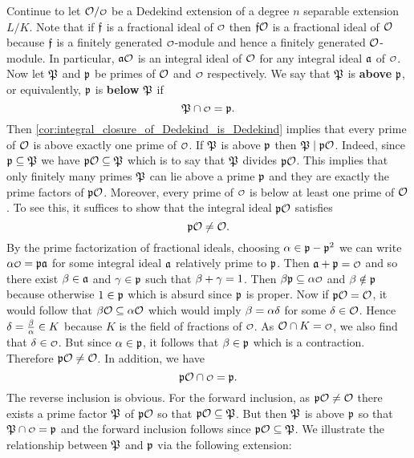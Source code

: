     Continue to let $\mc{O}/\smc{O}$ be a Dedekind extension of a degree $n$ separable extension $L/K$. Note that if $\mathfrak{f}$ is a fractional ideal of $\smc{O}$ then $\mathfrak{f}\mathcal{O}$ is a fractional ideal of $\mathcal{O}$ because $\mathfrak{f}$ is a finitely generated $\smc{O}$-module and hence a finitely generated $\mathcal{O}$-module. In particular, $\mathfrak{a}\mathcal{O}$ is an integral ideal of $\mathcal{O}$ for any integral ideal $\mathfrak{a}$ of $\smc{O}$. Now let $\mathfrak{P}$ and $\mathfrak{p}$ be primes of $\mathcal{O}$ and $\smc{O}$ respectively. We say that $\mathfrak{P}$ is \textbf{above} $\mathfrak{p}$, or equivalently, $\mathfrak{p}$ is \textbf{below} $\mathfrak{P}$ if
    \[
      \mf{P} \cap \smc{O} = \mf{p}.
    \]
    Then \cref{cor:integral_closure_of_Dedekind_is_Dedekind} implies that every prime of $\mathcal{O}$ is above exactly one prime of $\smc{O}$. If $\mathfrak{P}$ is above $\mathfrak{p}$ then $\mathfrak{P} \mid \mathfrak{p}\mathcal{O}$. Indeed, since $\mathfrak{p} \subseteq \mathfrak{P}$ we have $\mathfrak{p}\mathcal{O} \subseteq \mathfrak{P}$ which is to say that $\mathfrak{P}$ divides $\mathfrak{p}\mathcal{O}$. This implies that only finitely many primes $\mathfrak{P}$ can lie above a prime $\mathfrak{p}$ and they are exactly the prime factors of $\mathfrak{p}\mathcal{O}$. Moreover, every prime of $\smc{O}$ is below at least one prime of $\mathcal{O}$. To see this, it suffices to show that the integral ideal $\mathfrak{p}\mathcal{O}$ satisfies
    \[
      \mathfrak{p}\mathcal{O} \neq \mathcal{O}.
    \]
    By the prime factorization of fractional ideals, choosing $\alpha \in \mathfrak{p}-\mathfrak{p}^{2}$ we can write $\a\smc{O} = \mf{p}\mf{a}$ for some integral ideal $\mathfrak{a}$ relatively prime to $\mathfrak{p}$. Then $\mf{a}+\mf{p} = \smc{O}$ and so there exist $\beta \in \mathfrak{a}$ and $\gamma \in \mathfrak{p}$ such that $\beta+\gamma = 1$. Then $\b\mf{p} \subseteq \a\smc{O}$ and $\beta \notin \mathfrak{p}$ because otherwise $1 \in \mathfrak{p}$ which is absurd since $\mathfrak{p}$ is proper. Now if $\mathfrak{p}\mathcal{O} = \mathcal{O}$, it would follow that $\beta\mathcal{O} \subseteq \alpha\mathcal{O}$ which would imply $\beta = \alpha\delta$ for some $\delta \in \mathcal{O}$. Hence $\delta = \frac{\beta}{\alpha} \in K$ because $K$ is the field of fractions of $\smc{O}$. As $\mc{O} \cap K = \smc{O}$, we also find that $\d \in \smc{O}$. But since $\alpha \in \mathfrak{p}$, it follows that $\beta \in \mathfrak{p}$ which is a contraction. Therefore $\mathfrak{p}\mathcal{O} \neq \mathcal{O}$. In addition, we have
    \[
      \mf{p}\mc{O} \cap \smc{O} = \mf{p}.
    \]
    The reverse inclusion is obvious. For the forward inclusion, as $\mathfrak{p}\mathcal{O} \neq \mathcal{O}$ there exists a prime factor $\mathfrak{P}$ of $\mathfrak{p}\mathcal{O}$ so that $\mathfrak{p}\mathcal{O} \subseteq \mathfrak{P}$. But then $\mathfrak{P}$ is above $\mathfrak{p}$ so that $\mf{P} \cap \smc{O} = \mf{p}$ and the forward inclusion follows since $\mathfrak{p}\mathcal{O} \subseteq \mathfrak{P}$. We illustrate the relationship between $\mathfrak{P}$ and $\mathfrak{p}$ via the following extension:

